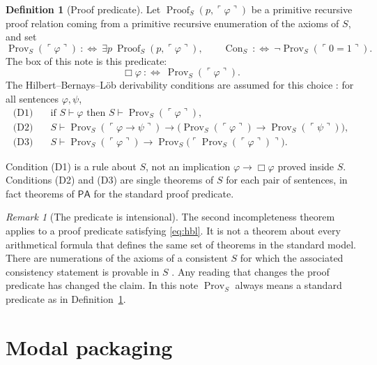 \documentclass[11pt]{article}
\newcommand{\gn}[1]{\ulcorner #1 \urcorner}
\DeclareMathOperator{\Prov}{Prov}
\DeclareMathOperator{\Con}{Con}
\DeclareMathOperator{\prf}{Proof}
\newcommand{\PA}{\mathsf{PA}}
\theoremstyle{definition}
\newtheorem{definition}[theorem]{Definition}
\theoremstyle{remark}
\newtheorem{remark}[theorem]{Remark}
\begin{document}
\begin{definition}[Proof predicate]
\label{def:prov}
Let \(\prf_{S}(p,\gn{\varphi})\) be a primitive recursive proof relation coming from a primitive recursive enumeration of the axioms of \(S\), and set
\[
\Prov_{S}(\gn{\varphi})\ :\Longleftrightarrow\ \exists p\ \prf_{S}(p,\gn{\varphi}),
\qquad
\Con_{S}\ :\Longleftrightarrow\ \neg\Prov_{S}(\gn{0=1}).
\]
The box of this note is this predicate:
\begin{equation}
\label{eq:box}
\Box\varphi\ :\Longleftrightarrow\ \Prov_{S}(\gn{\varphi}).
\end{equation}
The Hilbert--Bernays--L\"ob derivability conditions are assumed for this choice \citep{hilbertbernays1939,lob1955,boolos1993}: for all sentences \(\varphi,\psi\),
\begin{align}
\text{(D1)}\quad & \text{if } S\vdash\varphi \text{ then } S\vdash\Prov_{S}(\gn{\varphi}), \nonumber\\
\text{(D2)}\quad & S\vdash\Prov_{S}(\gn{\varphi\to\psi})\to\bigl(\Prov_{S}(\gn{\varphi})\to\Prov_{S}(\gn{\psi})\bigr), \label{eq:hbl}\\
\text{(D3)}\quad & S\vdash\Prov_{S}(\gn{\varphi})\to\Prov_{S}\bigl(\gn{\Prov_{S}(\gn{\varphi})}\bigr). \nonumber
\end{align}
\end{definition}

Condition (D1) is a rule about \(S\), not an implication \(\varphi\to\Box\varphi\) proved inside \(S\).
Conditions (D2) and (D3) are single theorems of \(S\) for each pair of sentences, in fact theorems of \(\PA\) for the standard proof predicate.

\begin{remark}[The predicate is intensional]
\label{rem:feferman}
The second incompleteness theorem applies to a proof predicate satisfying \eqref{eq:hbl}.
It is not a theorem about every arithmetical formula that defines the same set of theorems in the standard model.
There are numerations of the axioms of a consistent \(S\) for which the associated consistency statement is provable in \(S\) \citep{feferman1960}.
Any reading that changes the proof predicate has changed the claim.
In this note \(\Prov_{S}\) always means a standard predicate as in Definition~\ref{def:prov}.
\end{remark}

\section{Modal packaging}
\label{sec:modal}
\end{document}
